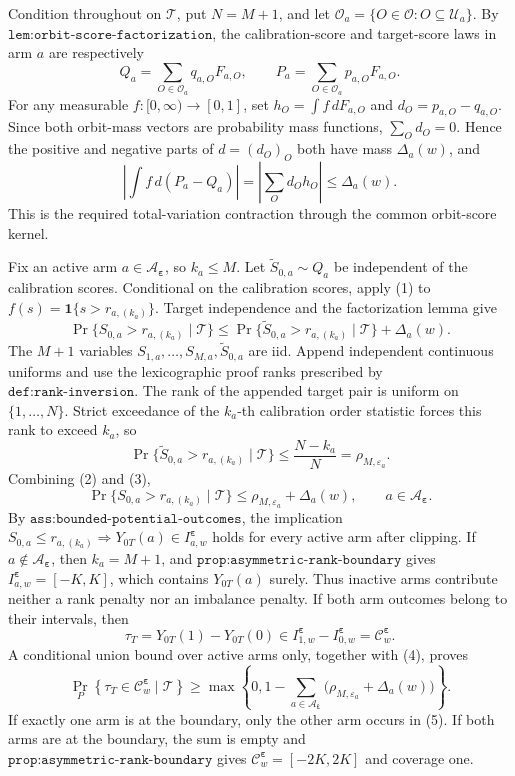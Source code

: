Condition throughout on \(\mathcal T\), put \(N=M+1\), and let \(\mathcal O_a=\{O\in\mathcal O:O\subseteq\mathcal U_a\}\). By \(\texttt{lem:orbit-score-factorization}\), the calibration-score and target-score laws in arm \(a\) are respectively
\[
Q_a=\sum_{O\in\mathcal O_a}q_{a,O}F_{a,O},\qquad P_a=\sum_{O\in\mathcal O_a}p_{a,O}F_{a,O}.
\]
For any measurable \(f:[0,\infty)\to[0,1]\), set \(h_O=\int f\,dF_{a,O}\) and \(d_O=p_{a,O}-q_{a,O}\). Since both orbit-mass vectors are probability mass functions, \(\sum_Od_O=0\). Hence the positive and negative parts of \(d=(d_O)_O\) both have mass \(\Delta_a(w)\), and
\[
\left|\int f\,d(P_a-Q_a)\right|=\left|\sum_Od_Oh_O\right|\le\Delta_a(w).
\tag{1}
\]
This is the required total-variation contraction through the common orbit-score kernel.

Fix an active arm \(a\in\mathcal A_{\boldsymbol\varepsilon}\), so \(k_a\le M\). Let \(\widetilde S_{0,a}\sim Q_a\) be independent of the calibration scores. Conditional on the calibration scores, apply (1) to \(f(s)=\mathbf 1\{s>r_{a,(k_a)}\}\). Target independence and the factorization lemma give
\[
\Pr\{S_{0,a}>r_{a,(k_a)}\mid\mathcal T\}\le\Pr\{\widetilde S_{0,a}>r_{a,(k_a)}\mid\mathcal T\}+\Delta_a(w).
\tag{2}
\]
The \(M+1\) variables \(S_{1,a},\ldots,S_{M,a},\widetilde S_{0,a}\) are iid. Append independent continuous uniforms and use the lexicographic proof ranks prescribed by \(\texttt{def:rank-inversion}\). The rank of the appended target pair is uniform on \(\{1,\ldots,N\}\). Strict exceedance of the \(k_a\)-th calibration order statistic forces this rank to exceed \(k_a\), so
\[
\Pr\{\widetilde S_{0,a}>r_{a,(k_a)}\mid\mathcal T\}\le\frac{N-k_a}{N}=\rho_{M,\varepsilon_a}.
\tag{3}
\]
Combining (2) and (3),
\[
\Pr\{S_{0,a}>r_{a,(k_a)}\mid\mathcal T\}\le\rho_{M,\varepsilon_a}+\Delta_a(w),\qquad a\in\mathcal A_{\boldsymbol\varepsilon}.
\tag{4}
\]
By \(\texttt{ass:bounded-potential-outcomes}\), the implication \(S_{0,a}\le r_{a,(k_a)}\Rightarrow Y_{0T}(a)\in I^{\boldsymbol\varepsilon}_{a,w}\) holds for every active arm after clipping. If \(a\notin\mathcal A_{\boldsymbol\varepsilon}\), then \(k_a=M+1\), and \(\texttt{prop:asymmetric-rank-boundary}\) gives \(I^{\boldsymbol\varepsilon}_{a,w}=[-K,K]\), which contains \(Y_{0T}(a)\) surely. Thus inactive arms contribute neither a rank penalty nor an imbalance penalty. If both arm outcomes belong to their intervals, then
\[
\tau_T=Y_{0T}(1)-Y_{0T}(0)\in I^{\boldsymbol\varepsilon}_{1,w}-I^{\boldsymbol\varepsilon}_{0,w}=\mathcal C^{\boldsymbol\varepsilon}_w.
\]
A conditional union bound over active arms only, together with (4), proves
\[
\Pr_P\!\left\{\tau_T\in\mathcal C^{\boldsymbol\varepsilon}_w\mid\mathcal T\right\}\ge\max\!\left\{0,1-\sum_{a\in\mathcal A_{\boldsymbol\varepsilon}}\bigl(\rho_{M,\varepsilon_a}+\Delta_a(w)\bigr)\right\}.
\tag{5}
\]
If exactly one arm is at the boundary, only the other arm occurs in (5). If both arms are at the boundary, the sum is empty and \(\texttt{prop:asymmetric-rank-boundary}\) gives \(\mathcal C^{\boldsymbol\varepsilon}_w=[-2K,2K]\) and coverage one.

